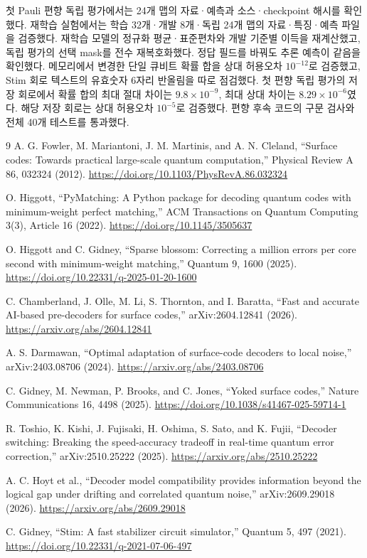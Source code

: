 \documentclass[aps,prd,12pt,twocolumn,superscriptaddress,floatfix]{revtex4-2}
\begin{document}
첫 Pauli 편향 독립 평가에서는 24개 맵의 자료·예측과 소스·checkpoint 해시를 확인했다. 재학습 실험에서는 학습 32개·개발 8개·독립 24개 맵의 자료·특징·예측 파일을 검증했다. 재학습 모델의 정규화 평균·표준편차와 개발 기준별 이득을 재계산했고, 독립 평가의 선택 mask를 전수 재복호화했다. 정답 필드를 바꿔도 추론 예측이 같음을 확인했다. 메모리에서 변경한 단일 큐비트 확률 합을 상대 허용오차 \(10^{-12}\)로 검증했고, Stim 회로 텍스트의 유효숫자 6자리 반올림을 따로 점검했다. 첫 편향 독립 평가의 저장 회로에서 확률 합의 최대 절대 차이는 \(9.8\times10^{-9}\), 최대 상대 차이는 \(8.29\times10^{-6}\)였다. 해당 저장 회로는 상대 허용오차 \(10^{-5}\)로 검증했다. 편향 후속 코드의 구문 검사와 전체 40개 테스트를 통과했다.

\begin{thebibliography}{9}
A. G. Fowler, M. Mariantoni, J. M. Martinis, and A. N. Cleland, “Surface codes: Towards practical large-scale quantum computation,” Physical Review A 86, 032324 (2012). \url{https://doi.org/10.1103/PhysRevA.86.032324}

O. Higgott, “PyMatching: A Python package for decoding quantum codes with minimum-weight perfect matching,” ACM Transactions on Quantum Computing 3(3), Article 16 (2022). \url{https://doi.org/10.1145/3505637}

O. Higgott and C. Gidney, “Sparse blossom: Correcting a million errors per core second with minimum-weight matching,” Quantum 9, 1600 (2025). \url{https://doi.org/10.22331/q-2025-01-20-1600}

C. Chamberland, J. Olle, M. Li, S. Thornton, and I. Baratta, “Fast and accurate AI-based pre-decoders for surface codes,” arXiv:2604.12841 (2026). \url{https://arxiv.org/abs/2604.12841}

A. S. Darmawan, “Optimal adaptation of surface-code decoders to local noise,” arXiv:2403.08706 (2024). \url{https://arxiv.org/abs/2403.08706}

C. Gidney, M. Newman, P. Brooks, and C. Jones, “Yoked surface codes,” Nature Communications 16, 4498 (2025). \url{https://doi.org/10.1038/s41467-025-59714-1}

R. Toshio, K. Kishi, J. Fujisaki, H. Oshima, S. Sato, and K. Fujii, “Decoder switching: Breaking the speed-accuracy tradeoff in real-time quantum error correction,” arXiv:2510.25222 (2025). \url{https://arxiv.org/abs/2510.25222}

A. C. Hoyt et al., “Decoder model compatibility provides information beyond the logical gap under drifting and correlated quantum noise,” arXiv:2609.29018 (2026). \url{https://arxiv.org/abs/2609.29018}

C. Gidney, “Stim: A fast stabilizer circuit simulator,” Quantum 5, 497 (2021). \url{https://doi.org/10.22331/q-2021-07-06-497}

\end{thebibliography}
\end{document}
